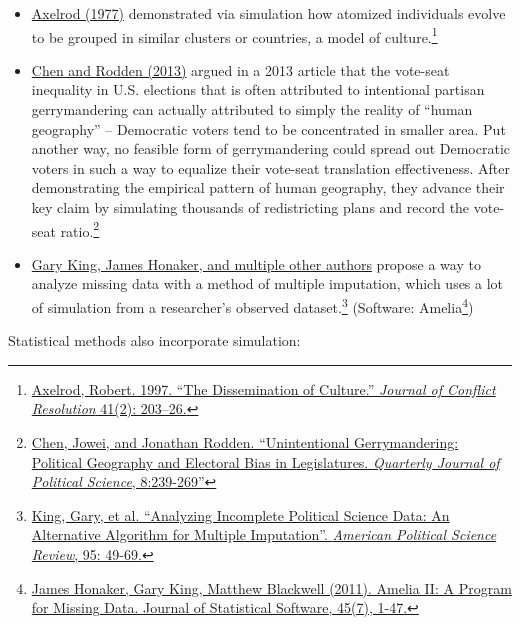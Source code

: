 \documentclass[]{book}
\newenvironment{Shaded}{\begin{snugshade}}{\end{snugshade}}
\providecommand{\tightlist}{%
  \setlength{\itemsep}{0pt}\setlength{\parskip}{0pt}}
\let\rmarkdownfootnote\footnote%
\def\footnote{\protect\rmarkdownfootnote}
\theoremstyle{definition}
\theoremstyle{definition}
\theoremstyle{definition}
\theoremstyle{remark}
\begin{document}
\begin{Shaded}
\begin{Highlighting}[]
\begin{Shaded}
\begin{Highlighting}[]
\begin{Shaded}
\begin{Highlighting}[]
\begin{itemize}
\tightlist
\item
  \href{http://www-personal.umich.edu/~axe/research/Dissemination.pdf}{Axelrod (1977)} demonstrated via simulation how atomized individuals evolve to be grouped in similar clusters or countries, a model of culture.\footnote{\href{http://www-personal.umich.edu/~axe/research/Dissemination.pdf}{Axelrod, Robert. 1997. ``The Dissemination of Culture.'' \emph{Journal of Conflict Resolution} 41(2): 203--26.}}
\item
  \href{http://www-personal.umich.edu/~jowei/florida.pdf}{Chen and Rodden (2013)} argued in a 2013 article that the vote-seat inequality in U.S. elections that is often attributed to intentional partisan gerrymandering can actually attributed to simply the reality of ``human geography'' -- Democratic voters tend to be concentrated in smaller area. Put another way, no feasible form of gerrymandering could spread out Democratic voters in such a way to equalize their vote-seat translation effectiveness. After demonstrating the empirical pattern of human geography, they advance their key claim by simulating thousands of redistricting plans and record the vote-seat ratio.\footnote{\href{http://www-personal.umich.edu/~jowei/florida.pdf}{Chen, Jowei, and Jonathan Rodden. ``Unintentional Gerrymandering: Political Geography and Electoral Bias in Legislatures. \emph{Quarterly Journal of Political Science}, 8:239-269''}}
\item
  \href{https://gking.harvard.edu/files/abs/evil-abs.shtml}{Gary King, James Honaker, and multiple other authors} propose a way to analyze missing data with a method of multiple imputation, which uses a lot of simulation from a researcher's observed dataset.\footnote{\href{https://gking.harvard.edu/files/abs/evil-abs.shtml}{King, Gary, et al. ``Analyzing Incomplete Political Science Data: An Alternative Algorithm for Multiple Imputation''. \emph{American Political Science Review}, 95: 49-69.}} (Software: Amelia\footnote{\href{http://www.jstatsoft.org/v45/i07/}{James Honaker, Gary King, Matthew Blackwell (2011). Amelia II: A Program for Missing Data. Journal of
    Statistical Software, 45(7), 1-47.}})
\end{itemize}

Statistical methods also incorporate simulation:


\end{Highlighting}
\end{Shaded}
\end{Highlighting}
\end{Shaded}
\end{Highlighting}
\end{Shaded}
\end{document}
